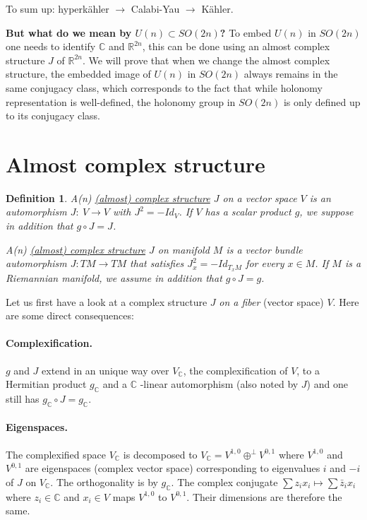 \documentclass[11pt]{article}
\newtheorem{definition}{Definition}
\begin{document}
To sum up: hyperkähler \(\longrightarrow\) Calabi-Yau \(\longrightarrow\) Kähler.

\textbf{But what do we mean by \(U(n)\subset SO(2n)\)?} To embed \(U(n)\) in \(SO(2n)\) one needs to identify \(\mathbb{C}\) and \(\mathbb{R}^{2n}\), this can be done using an almost complex structure \(J\) of \(\mathbb{R}^{2n}\). We will prove that when we change the almost complex structure, the embedded image of
\(U(n)\) in \(SO(2n)\) always remains in the same conjugacy class, which corresponds to the
fact that while holonomy representation is well-defined, the holonomy group in \(SO(2n)\) is only
defined up to its conjugacy class.

\section{Almost complex structure}
\label{sec:org099b129}
\begin{definition}
A(n) \uline{(almost) complex structure} \(J\) on a vector space \(V\) is an automorphism \(J:\ V\longrightarrow V\)
with \(J^2 = -Id_V\). If \(V\) has a scalar product \(g\), we suppose in addition that \(g\circ J = J\).

A(n) \uline{(almost) complex structure} \(J\) on manifold \(M\) is a vector bundle automorphism \(J: TM\longrightarrow
TM\) that satisfies \(J_x^2 = -Id_{T_xM}\) for every \(x\in M\). If \(M\) is a Riemannian manifold, we
assume in addition that \(g\circ J = g\).
\end{definition}

Let us first have a look at a complex structure \(J\) \emph{on a fiber} (vector space) \(V\). Here are some
direct consequences:

\paragraph{Complexification.}
\label{sec:org21cb80b}
\(g\) and \(J\) extend in an unique way over \(V_{ \mathbb{C}}\), the complexification of \(V\), to a
Hermitian product \(g_{\mathbb{C}}\) and a \(\mathbb{C}\) -linear automorphism (also noted by \(J\)) and one
still has \(g_{\mathbb{C}}\circ J = g_{\mathbb{C}}\).

\paragraph{Eigenspaces.}
\label{sec:orgf09b3d6}
The complexified space \(V_{ \mathbb{C}}\) is decomposed to \(V_{\mathbb{C}} =
V^{1,0} \oplus^\perp V^{0,1}\) where \(V^{1,0}\) and \(V^{0,1}\) are eigenspaces (complex vector space)
corresponding to eigenvalues \(i\) and \(-i\) of \(J\) on \(V_{\mathbb{C}}\). The orthogonality is by
\(g_{\mathbb{C}}\). The complex conjugate \(\sum z_i x_i \mapsto \sum \bar z_i x_i\) where \(z_i\in
\mathbb{C}\) and \(x_i\in V\) maps \(V^{1,0}\) to \(V^{0,1}\). Their dimensions are therefore the same.
\end{document}
